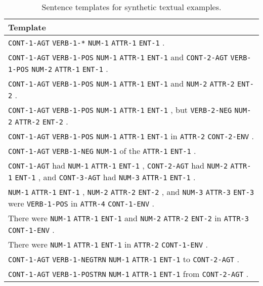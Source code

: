 \documentclass[11pt,a4paper]{article}
\begin{document}
\begin{table*}[t]
    \footnotesize
    \centering
    \begin{tabular}{p{15.0cm}}
        \bf Template\\ 
        \toprule
        \texttt{CONT-1-AGT} \texttt{VERB-1-*} \texttt{NUM-1} \texttt{ATTR-1} \texttt{ENT-1} . \\
        \texttt{CONT-1-AGT} \texttt{VERB-1-POS} \texttt{NUM-1} \texttt{ATTR-1} \texttt{ENT-1} and \texttt{CONT-2-AGT} \texttt{VERB-1-POS} \texttt{NUM-2} \texttt{ATTR-1} \texttt{ENT-1} . \\
        \texttt{CONT-1-AGT} \texttt{VERB-1-POS} \texttt{NUM-1} \texttt{ATTR-1} \texttt{ENT-1} and \texttt{NUM-2} \texttt{ATTR-2} \texttt{ENT-2} . \\
        \texttt{CONT-1-AGT} \texttt{VERB-1-POS} \texttt{NUM-1} \texttt{ATTR-1} \texttt{ENT-1} , but \texttt{VERB-2-NEG} \texttt{NUM-2} \texttt{ATTR-2} \texttt{ENT-2} . \\
        \texttt{CONT-1-AGT} \texttt{VERB-1-POS} \texttt{NUM-1} \texttt{ATTR-1} \texttt{ENT-1} in \texttt{ATTR-2} \texttt{CONT-2-ENV} . \\
        \texttt{CONT-1-AGT} \texttt{VERB-1-NEG} \texttt{NUM-1} of the \texttt{ATTR-1} \texttt{ENT-1} . \\
        \texttt{CONT-1-AGT} had \texttt{NUM-1} \texttt{ATTR-1} \texttt{ENT-1} , \texttt{CONT-2-AGT} had \texttt{NUM-2} \texttt{ATTR-1} \texttt{ENT-1} , and \texttt{CONT-3-AGT} had \texttt{NUM-3} \texttt{ATTR-1} \texttt{ENT-1} . \\
        \texttt{NUM-1} \texttt{ATTR-1} \texttt{ENT-1} , \texttt{NUM-2} \texttt{ATTR-2} \texttt{ENT-2} , and \texttt{NUM-3} \texttt{ATTR-3} \texttt{ENT-3} were \texttt{VERB-1-POS} in \texttt{ATTR-4} \texttt{CONT-1-ENV} . \\
        There were \texttt{NUM-1} \texttt{ATTR-1} \texttt{ENT-1} and \texttt{NUM-2} \texttt{ATTR-2} \texttt{ENT-2} in \texttt{ATTR-3} \texttt{CONT-1-ENV} . \\
        There were \texttt{NUM-1} \texttt{ATTR-1} \texttt{ENT-1} in \texttt{ATTR-2} \texttt{CONT-1-ENV} . \\
        \texttt{CONT-1-AGT} \texttt{VERB-1-NEGTRN} \texttt{NUM-1} \texttt{ATTR-1} \texttt{ENT-1} to \texttt{CONT-2-AGT} . \\
        \texttt{CONT-1-AGT} \texttt{VERB-1-POSTRN} \texttt{NUM-1} \texttt{ATTR-1} \texttt{ENT-1} from \texttt{CONT-2-AGT} . \\
    \end{tabular}
    \caption{Sentence templates for synthetic textual examples.}
    \label{table:synthetic_passages}
\end{table*}
\end{document}
